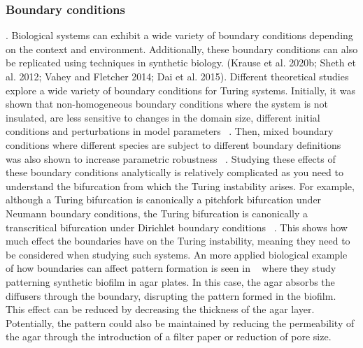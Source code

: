 \subsubsection{Boundary conditions}.
Biological systems can exhibit a wide variety of boundary conditions depending on the context and environment.
Additionally, these boundary conditions can also be replicated using techniques in synthetic biology. (Krause et al.
2020b; Sheth et al.
2012; Vahey and Fletcher 2014; Dai et al.
2015).
Different theoretical studies explore a wide variety of boundary conditions for Turing systems.
Initially, it was shown that non-homogeneous boundary conditions where the system is not insulated, are less sensitive to changes in the domain size, different initial conditions and perturbations in model parameters ~\parencite{Arcuri1986}.
Then, mixed boundary conditions where different species are subject to different boundary definitions was also shown to increase parametric robustness ~\parencite{Maini1993, Maini1997, Krause2021}.
Studying these effects of these boundary conditions analytically is relatively complicated as you need to understand the bifurcation from which the Turing instability arises.
For example, although a Turing bifurcation is canonically a pitchfork bifurcation under Neumann boundary conditions, the Turing bifurcation is canonically a transcritical bifurcation under Dirichlet boundary conditions ~\parencite{Woolley2022}. %
This shows how much effect the boundaries have on the Turing instability, meaning they need to be considered when studying such systems.
An more applied biological example of how boundaries can affect pattern formation is seen in ~\parencite{Krause2020} where they study patterning synthetic biofilm in agar plates.
In this case, the agar absorbs the diffusers through the boundary, disrupting the pattern formed in the biofilm.
This effect can be reduced by decreasing the thickness of the agar layer.
Potentially, the pattern could also be maintained by reducing the permeability of the agar through the introduction of a filter paper or reduction of pore size.


%






